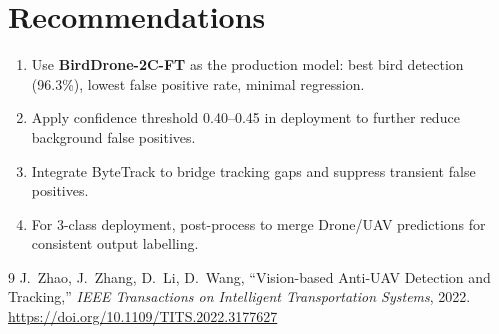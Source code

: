\documentclass[11pt]{article}
\begin{document}
\section{Recommendations}

\begin{enumerate}
  \item Use \textbf{BirdDrone-2C-FT} as the production model: best bird
        detection (96.3\%), lowest false positive rate, minimal regression.
  \item Apply confidence threshold 0.40--0.45 in deployment to further
        reduce background false positives.
  \item Integrate ByteTrack to bridge tracking gaps and suppress transient
        false positives.
  \item For 3-class deployment, post-process to merge Drone/UAV predictions
        for consistent output labelling.
\end{enumerate}

\begin{thebibliography}{9}
J.\ Zhao, J.\ Zhang, D.\ Li, D.\ Wang,
``Vision-based Anti-UAV Detection and Tracking,''
\textit{IEEE Transactions on Intelligent Transportation Systems}, 2022.
\url{https://doi.org/10.1109/TITS.2022.3177627}
\end{thebibliography}
\end{document}
